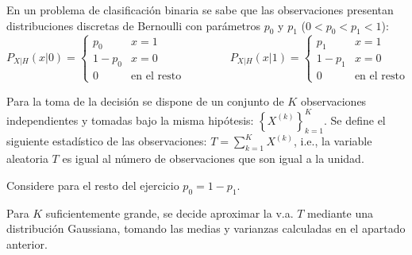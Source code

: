 \question 

\ifspanish

En un problema de clasificación binaria se sabe que las observaciones presentan distribuciones discretas de Bernoulli con parámetros $p_0$ y $p_1$ ($0 < p_0 < p_1 < 1$):
$$
P_{X|H}(x|0) = \left\{ \begin{array}{ll}  
					   p_0 & x=1 \\ 1-p_0 & x=0 \\0 & \mbox{en el resto}	
					   \end{array}  \right.
\qquad \qquad 
P_{X|H}(x|1) = \left\{ \begin{array}{ll}  
					   p_1 & x=1 \\ 1-p_1 & x=0 \\0 & \mbox{en el resto}
					   \end{array}  \right.
$$		    
					    
Para la toma de la decisión se dispone de un conjunto de $K$ observaciones independientes y tomadas bajo la misma hipótesis:  $\left\{ X^{(k)} \right\}_{k=1}^K$. Se define el siguiente estadístico de las observaciones:  $T=\sum_{k=1}^K X^{(k)}$, i.e., la variable aleatoria $T$ es igual al número de observaciones que son igual a la unidad.
Considere para el resto del ejercicio $p_0 =1 - p_1$.

Para $K$ suficientemente grande, se decide aproximar la v.a. $T$ mediante una distribución Gaussiana, tomando las medias y varianzas calculadas en el apartado anterior. 


